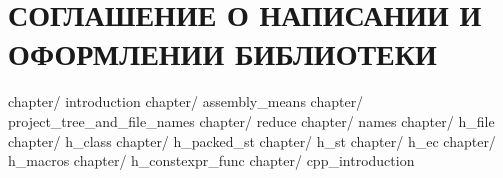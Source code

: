 \part{СОГЛАШЕНИЕ О НАПИСАНИИ И ОФОРМЛЕНИИ БИБЛИОТЕКИ}\label{logic:bib2}

	{chapter/}	{introduction}					%
	{chapter/}	{assembly_means}				%
	{chapter/}	{project_tree_and_file_names}	%
	{chapter/}	{reduce}						%
	{chapter/}	{names}							%
	{chapter/}	{h_file}						%
	{chapter/}	{h_class}						%
	{chapter/}	{h_packed_st}					%
	{chapter/}	{h_st}							%
	{chapter/}	{h_ec}							%
	{chapter/}	{h_macros}						%
	{chapter/}	{h_constexpr_func}				%
	{chapter/}	{cpp_introduction}				%